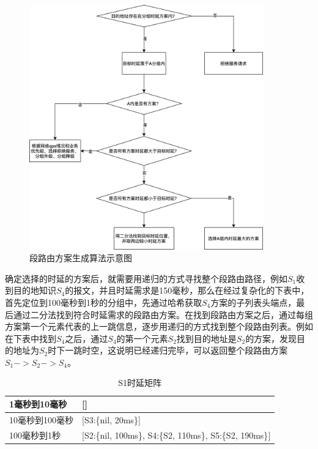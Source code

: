 \begin{figure}[htbp]
\setlength{\abovecaptionskip}{15pt plus 3pt minus 2pt}
\centerline{\includegraphics[width=0.9\textwidth]{./figures/ch4-find-sr-ans.png}}
\caption{段路由方案生成算法示意图}
\label{fig-ch4-find-sr-ans}
\end{figure}
    
确定选择的时延的方案后，就需要用递归的方式寻找整个段路由路径，例如$S_1$收到目的地知识$S_4$的报文，并且时延需求是150毫秒，那么在经过复杂化的下表中，首先定位到100毫秒到1秒的分组中，先通过哈希获取$S_4$方案的子列表头端点，最后通过二分法找到符合时延需求的段路由方案。在找到段路由方案之后，通过每组方案第一个元素代表的上一跳信息，逐步用递归的方式找到整个段路由列表。例如在下表中找到$S_4$之后，通过$S_4$的第一个元素$S_2$找到目的地址是$S_2$的方案，发现目的地址为$S_2$时下一跳时空，这说明已经递归完毕，可以返回整个段路由方案$S_1->S_2->S_4$。

\begin{table}[htbp]
\begin{tabular}{|p{}|p{}|}
\hline
1毫秒到10毫秒 & {[}{]} \\ \hline
10毫秒到100毫秒 & {[}S3:\{nil, 20ms\}{]} \\ \hline
100毫秒到1秒 & {[}S2:\{nil, 100ms\}, S4:\{S2, 110ms\}, S5:\{S2, 190ms\}{]} \\ \hline
\end{tabular}
\caption{S1时延矩阵}
\label{table-S1-delay-metric}
\end{table}

